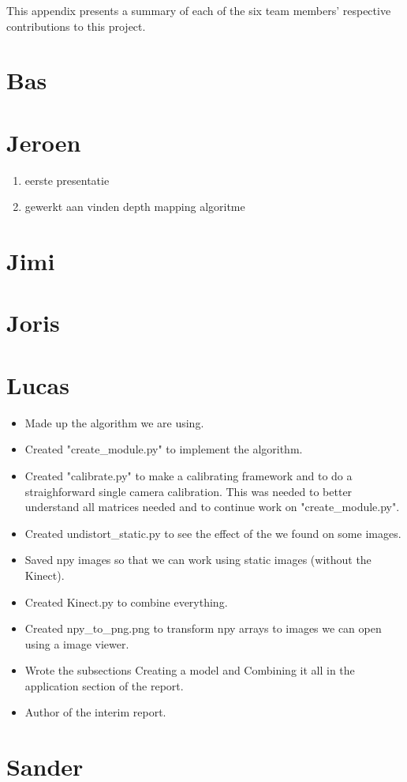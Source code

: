 This appendix presents a summary of each of the six team members' respective
contributions to this project.


\section*{Bas}


\section*{Jeroen}
\begin{enumerate}
\item eerste presentatie
\item gewerkt aan vinden depth mapping algoritme
\end{enumerate}

\section*{Jimi}


\section*{Joris}


\section*{Lucas}
\begin{itemize}
\item Made up the algorithm we are using.
\item Created "create\_module.py" to implement the algorithm.
\item Created "calibrate.py" to make a calibrating framework and to do a 
straighforward single camera calibration. This was needed to better understand 
all matrices needed and to continue work on "create\_module.py".
\item Created undistort\_static.py to see the effect of the we found on some images.
\item Saved npy images so that we can work using static images (without the Kinect).
\item Created Kinect.py to combine everything.
\item Created npy\_to\_png.png to transform npy arrays to images we can open 
using a image viewer.
\item Wrote the subsections Creating a model and Combining it all in the 
application section of the report.
\item Author of the interim report.
\end{itemize}
\section*{Sander}
